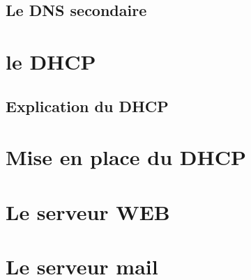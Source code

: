 \documentclass[12pt, a4paper]{article}
\begin{document}
    \subsection{Le DNS secondaire}


\section{le DHCP}
    \subsection{Explication du DHCP}

    \section{Mise en place du DHCP}


\section{Le serveur WEB}


\section{Le serveur mail}
\end{document}
